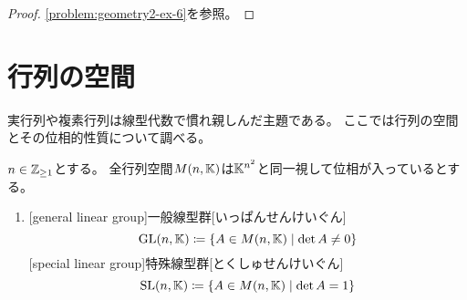 \documentclass[report]{jlreq}
\begin{document}
\begin{proof}
    \cref{problem:geometry2-ex-6}を参照。
\end{proof}

%
\section{行列の空間}

実行列や複素行列は線型代数で慣れ親しんだ主題である。
ここでは行列の空間とその位相的性質について調べる。

\begin{definition}
    $n \in \mathbb{Z}_{\ge 1}$とする。
    全行列空間$M(n, \mathbb{K})$は$\mathbb{K}^{n^2}$と同一視して位相が入っているとする。
    \begin{enumerate}
        \item
            [general linear group]{一般線型群}[いっぱんせんけいぐん]
            \begin{equation}
                \operatorname{\mathrm{GL}}(n, \mathbb{K})
                    \coloneqq \{
                        A \in M(n, \mathbb{K}) \mid \det A \neq 0
                    \}
            \end{equation}
            [special linear group]{特殊線型群}[とくしゅせんけいぐん]
            \begin{equation}
                \operatorname{\mathrm{SL}}(n, \mathbb{K})
                    \coloneqq \{
                        A \in M(n, \mathbb{K}) \mid \det A = 1
                    \}
            \end{equation}
    \end{enumerate}
\end{definition}
\end{document}
